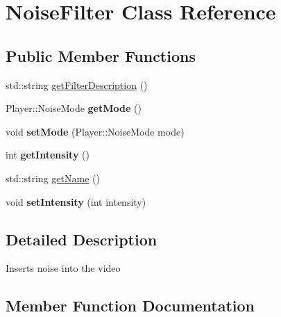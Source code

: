 \hypertarget{classPlayer_1_1NoiseFilter}{}\section{Noise\+Filter Class Reference}
\label{classPlayer_1_1NoiseFilter}
\subsection*{Public Member Functions}
\begin{DoxyCompactItemize}
\item 
std\+::string \hyperlink{classPlayer_1_1NoiseFilter_a2b3f7d8fcd3d774b4a2fde5914a9729f}{get\+Filter\+Description} ()
\item 
\hypertarget{classPlayer_1_1NoiseFilter_a528c052fc8153d4b7b5d13b3bdd024f2}{}Player\+::\+Noise\+Mode {\bfseries get\+Mode} ()\label{classPlayer_1_1NoiseFilter_a528c052fc8153d4b7b5d13b3bdd024f2}

\item 
\hypertarget{classPlayer_1_1NoiseFilter_a52b8b78da20793d0a92068f5aec56b1c}{}void {\bfseries set\+Mode} (Player\+::\+Noise\+Mode mode)\label{classPlayer_1_1NoiseFilter_a52b8b78da20793d0a92068f5aec56b1c}

\item 
\hypertarget{classPlayer_1_1NoiseFilter_a708995fb1b6acb31ee0dfb0f4881e5b5}{}int {\bfseries get\+Intensity} ()\label{classPlayer_1_1NoiseFilter_a708995fb1b6acb31ee0dfb0f4881e5b5}

\item 
std\+::string \hyperlink{classPlayer_1_1NoiseFilter_ac0fc966d4386ddb71d99361e3fccb311}{get\+Name} ()
\item 
\hypertarget{classPlayer_1_1NoiseFilter_ac8255ffbc46bb61acaa8fd23d0d260eb}{}void {\bfseries set\+Intensity} (int intensity)\label{classPlayer_1_1NoiseFilter_ac8255ffbc46bb61acaa8fd23d0d260eb}

\end{DoxyCompactItemize}


\subsection{Detailed Description}
Inserts noise into the video 

\subsection{Member Function Documentation}
\hypertarget{classPlayer_1_1NoiseFilter_a2b3f7d8fcd3d774b4a2fde5914a9729f}{}
